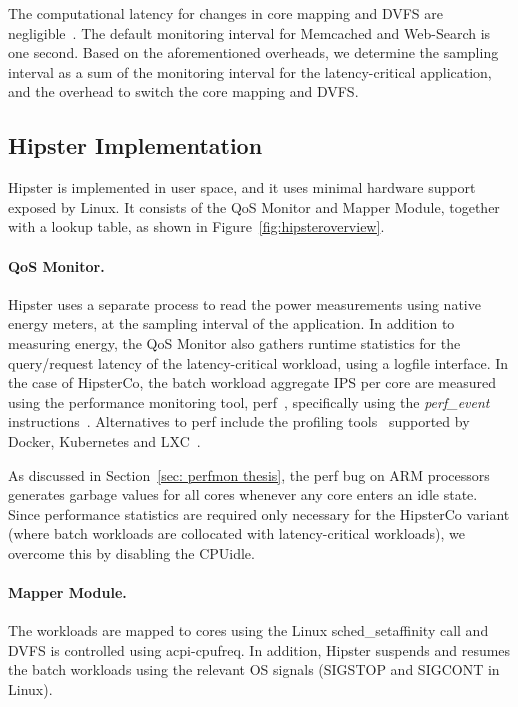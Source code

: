 The computational latency for changes in core mapping and DVFS are
negligible~\citep{Cong2012Energy-efficientArchitectures, Leverich2009PowerGating, Madan2011AProcessorsb}.
The default monitoring interval for Memcached and Web-Search is one second. Based on the
aforementioned overheads, we determine the  sampling interval as a sum of the monitoring
interval for the latency-critical application, and the overhead to switch the core mapping
and DVFS.


\subsection{Hipster Implementation}
\label{subsec: implementation}

Hipster is implemented in user space, and it uses minimal hardware support exposed by
Linux. It consists of the QoS Monitor and Mapper Module, together with a lookup table, as
shown in Figure~\ref{fig:hipsteroverview}. 

 \paragraph{QoS Monitor.} Hipster uses a separate process to read the power measurements
using native energy meters, at the sampling interval of the application. In addition to
measuring energy, the QoS Monitor also gathers runtime statistics for the query/request
latency of the latency-critical workload, using a logfile interface. In the case of
HipsterCo, the  batch workload aggregate IPS per core are measured using the performance
monitoring tool, \textsf{perf}~\citep{2016Perf:Counters}, specifically using the
\textit{perf\_event}
\textsf{instructions}~\citep{ARMLimitedARMManual,ARMLimitedARMManualb}. Alternatives to
\textsf{perf} include the profiling tools~\citep{Ren2010Google-WideCenters,
Kanev:2015:PWC:2749469.2750392} supported by Docker, Kubernetes and
LXC~\citep{Bernstein2014ContainersKubernetes}.  

As discussed in Section~\ref{sec: perfmon thesis}, the \textsf{perf} bug on ARM processors
generates garbage values for all cores whenever any core enters an idle state.  Since
performance statistics are required only necessary for the HipsterCo variant (where batch
workloads are collocated with latency-critical workloads), we overcome this by disabling
the CPUidle. 

\vspace{-2mm}

 \paragraph{Mapper Module.} The workloads are mapped to cores using the Linux
\textsf{sched\_setaffinity} call and DVFS is controlled using \textsf{acpi-cpufreq}. In
addition, Hipster suspends and resumes the batch workloads using the relevant OS signals
({\small \textsf{SIGSTOP}} and {\small \textsf{SIGCONT}} in Linux).

